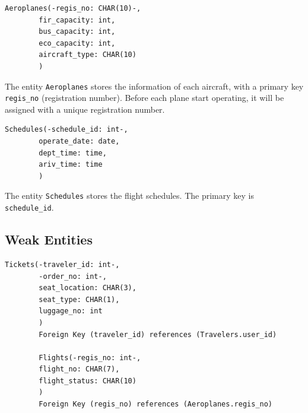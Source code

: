 \documentclass{article}
\begin{document}
	\begin{lstlisting}[keepspaces=true]               
		Aeroplanes(-regis_no: CHAR(10)-,
		fir_capacity: int,
		bus_capacity: int, 
		eco_capacity: int,
		aircraft_type: CHAR(10)
		)
	\end{lstlisting}    
	
	The entity \texttt{Aeroplanes} stores the information of each aircraft, with a primary key \texttt{regis\_no} (registration number). Before each plane start operating, it will be assigned with a unique registration number.
	
	\begin{lstlisting}[keepspaces=true] 
		Schedules(-schedule_id: int-, 
		operate_date: date,
		dept_time: time,
		ariv_time: time
		)
	\end{lstlisting}
	
	The entity \texttt{Schedules} stores the flight schedules. The primary key is \texttt{schedule\_id}.
	
	\subsection{Weak Entities}
	
	\begin{lstlisting}[keepspaces=true]
		Tickets(-traveler_id: int-, 
		-order_no: int-, 
		seat_location: CHAR(3),
		seat_type: CHAR(1),
		luggage_no: int
		)
		Foreign Key (traveler_id) references (Travelers.user_id)
		
		Flights(-regis_no: int-, 
		flight_no: CHAR(7),
		flight_status: CHAR(10)
		)
		Foreign Key (regis_no) references (Aeroplanes.regis_no)
	\end{lstlisting}
\end{document}

